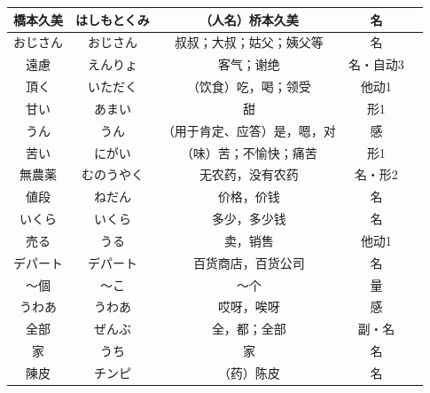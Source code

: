 \begin{longtable}{|c|c|c|c|c|}
橋本久美 & はしもとくみ & （人名）桥本久美 & 名 & \\ \hline
おじさん & おじさん & 叔叔；大叔；姑父；姨父等 & 名 & \\ \hline
遠慮 & えんりょ & 客气；谢绝 & 名・自动3 & \\ \hline
頂く & いただく & （饮食）吃，喝；领受 & 他动1 & \\ \hline
甘い & あまい & 甜 & 形1 & \\ \hline
うん & うん & （用于肯定、应答）是，嗯，对 & 感 & \\ \hline
苦い & にがい & （味）苦；不愉快；痛苦 & 形1 & \\ \hline
無農薬 & むのうやく & 无农药，没有农药 & 名・形2 & \\ \hline
値段 & ねだん & 价格，价钱 & 名 & \\ \hline
いくら & いくら & 多少，多少钱 & 名 & \\ \hline
売る & うる & 卖，销售 & 他动1 & \\ \hline
デパート & デパート & 百货商店，百货公司 & 名 & \\ \hline
〜個 & 〜こ & 〜个 & 量 & \\ \hline
うわあ & うわあ & 哎呀，唉呀 & 感 & \\ \hline
全部 & ぜんぶ & 全，都；全部 & 副・名 & \\ \hline
家 & うち & 家 & 名 & \\ \hline
陳皮 & チンピ & （药）陈皮 & 名 & \\ \hline
\end{longtable}

